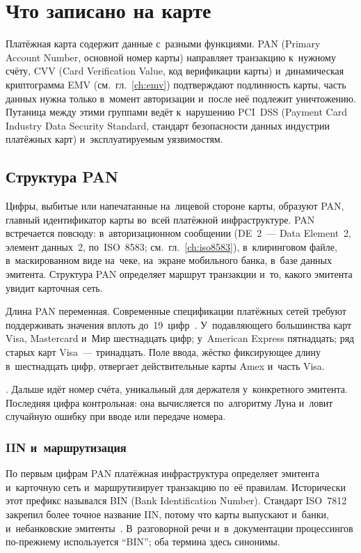 
\chapter{Что записано на карте}\label{ch:card-data}
Платёжная карта содержит данные с~разными функциями. PAN (Primary Account
Number, основной номер карты) направляет транзакцию к~нужному счёту, CVV (Card
Verification Value, код верификации карты) и~динамическая криптограмма EMV
(см.~гл.~\ref{ch:emv}) подтверждают подлинность карты, часть данных нужна
только в~момент авторизации и~после неё подлежит уничтожению.
Путаница между этими группами ведёт к~нарушению PCI~DSS (Payment Card Industry
Data Security Standard, стандарт безопасности данных индустрии платёжных карт)
и~эксплуатируемым уязвимостям.

\section{Структура PAN}\label{sec:card-data-pan}

Цифры, выбитые или напечатанные на~лицевой стороне карты, образуют PAN, главный
идентификатор карты во~всей платёжной инфраструктуре. PAN встречается повсюду:
в~авторизационном сообщении (DE~2~--- Data Element~2, элемент данных~2,
по~ISO~8583; см.~гл.~\ref{ch:iso8583}), в~клиринговом файле, в~маскированном
виде на~чеке, на~экране мобильного банка, в~базе данных эмитента. Структура
PAN определяет маршрут транзакции и~то, какого эмитента увидит карточная сеть.

Длина PAN переменная. Современные спецификации платёжных сетей требуют
поддерживать значения вплоть до~19~цифр~\cite{iso-7812-transition,visa-tadg}.
У~подавляющего большинства карт Visa, Mastercard и~Мир шестнадцать
цифр; у~American Express пятнадцать; ряд старых карт
Visa~--- тринадцать. Поле ввода, жёстко фиксирующее длину в~шестнадцать цифр,
отвергает действительные карты Amex и~часть Visa.

. Дальше идёт номер счёта,
уникальный для держателя у~конкретного эмитента. Последняя цифра контрольная:
она вычисляется по~алгоритму Луна и~ловит случайную ошибку при вводе или
передаче номера.

\subsection*{IIN и~маршрутизация}

По первым цифрам PAN платёжная инфраструктура определяет эмитента и~карточную
сеть и~маршрутизирует транзакцию по~её правилам. Исторически этот префикс
назывался BIN (Bank Identification Number). Стандарт ISO~7812 закрепил более точное название IIN, потому что
карты выпускают и~банки, и~небанковские
эмитенты~\cite{iso-7812-transition,ansi-iin}. В~разговорной речи
и~в~документации процессингов по-прежнему используется \enquote{BIN}; оба
термина здесь синонимы.

